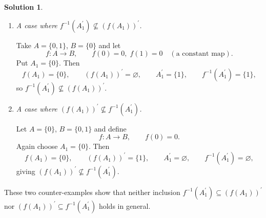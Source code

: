 \documentclass[12pt]{article}
\theoremstyle{definition} %
\newtheorem{solution}{Solution}
\theoremstyle{plain} %
\begin{document}
\begin{solution}
\begin{enumerate}[label=(\alph*)]
      \begin{enumerate}[label=\roman*.]
          \item \emph{A case where \(f^{-1}(A_{1}^{\prime})\nsubseteq(f(A_{1}))^{\prime}\).}
      
                Take \(A=\{0,1\}\), \(B=\{0\}\) and let
                \[
                    f:A\to B,\qquad f(0)=0,\;f(1)=0\quad(\text{a constant map}).
                \]
                Put \(A_{1}=\{0\}\).
                Then
                \[
                    f(A_{1})=\{0\},\qquad (f(A_{1}))^{\prime}=\varnothing,
                    \qquad A_{1}^{\prime}=\{1\},\qquad
                    f^{-1}(A_{1}^{\prime})=\{1\},
                \]
                so \(f^{-1}(A_{1}^{\prime})\not\subseteq(f(A_{1}))^{\prime}\).
      
          \item \emph{A case where \((f(A_{1}))^{\prime}\nsubseteq f^{-1}(A_{1}^{\prime})\).}
      
                Let \(A=\{0\}\), \(B=\{0,1\}\) and define
                \[
                    f:A\to B,\qquad f(0)=0.
                \]
                Again choose \(A_{1}=\{0\}\).
                Then
                \[
                    f(A_{1})=\{0\},\qquad (f(A_{1}))^{\prime}=\{1\},\qquad
                    A_{1}^{\prime}=\varnothing,\qquad f^{-1}(A_{1}^{\prime})=\varnothing,
                \]
                giving \((f(A_{1}))^{\prime}\not\subseteq f^{-1}(A_{1}^{\prime})\).
      \end{enumerate}
      
      These two counter-examples show that neither inclusion  
      \(f^{-1}(A_{1}^{\prime})\subseteq(f(A_{1}))^{\prime}\) nor  
      \((f(A_{1}))^{\prime}\subseteq f^{-1}(A_{1}^{\prime})\) holds in general.
      \end{enumerate}
      \end{solution}
\end{document}
